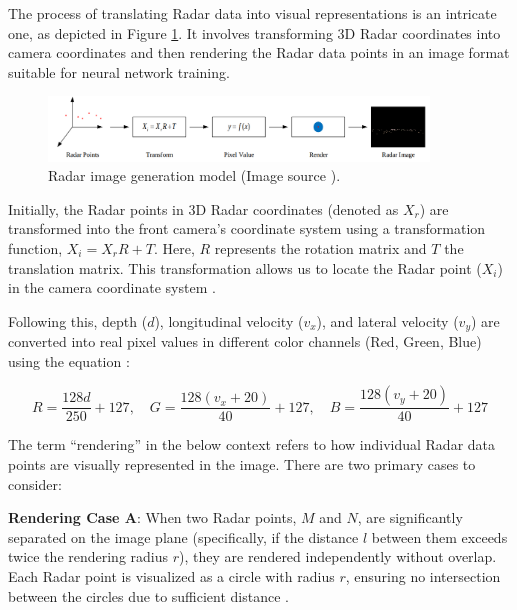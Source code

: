 \documentclass[report.tex]{subfiles}
\begin{document}
    The process of translating Radar data into visual representations is an intricate one, as depicted in Figure \ref{fig:saffcos_Radar_image_generation_process}. It involves transforming 3D Radar coordinates into camera coordinates and then rendering the Radar data points in an image format suitable for neural network training.

    \begin{figure}[h]
        \centering
        \includegraphics[width=0.9\textwidth]{images/methods/saf_fcos/the_Radar_image_generation_process.png}
        \caption{Radar image generation model (Image source \cite{chang2020spatial}).}
        \label{fig:saffcos_Radar_image_generation_process}
    \end{figure}

    Initially, the Radar points in 3D Radar coordinates (denoted as ${X_r}$) are transformed into the front camera's coordinate system using a transformation function, ${X_i = X_r R + T}$. Here, ${R}$ represents the rotation matrix and ${T}$ the translation matrix. This transformation allows us to locate the Radar point (${X_i}$) in the camera coordinate system \cite{chang2020spatial}.

    \vspace{\baselineskip}
    \vspace{\baselineskip}
    \vspace{\baselineskip}

    Following this, depth (${d}$), longitudinal velocity (${v_x}$), and lateral velocity (${v_y}$) are converted into real pixel values in different color channels (Red, Green, Blue) using the equation \cite{chang2020spatial}:

    \begin{equation}
        R = \frac{128d}{250} + {127}, \quad G = \frac{128(v_x + 20)}{40} + {127}, \quad B = \frac{128(v_y + 20)}{40} + {127}
    \end{equation}

    The term ``rendering'' in the below context refers to how individual Radar data points are visually represented in the image. There are two primary cases to consider:

    \textbf{Rendering Case A}: When two Radar points, \( M \) and \( N \), are significantly separated on the image plane (specifically, if the distance \( l \) between them exceeds twice the rendering radius \( r \)), they are rendered independently without overlap. Each Radar point is visualized as a circle with radius \( r \), ensuring no intersection between the circles due to sufficient distance \cite{chang2020spatial}.
\end{document}

